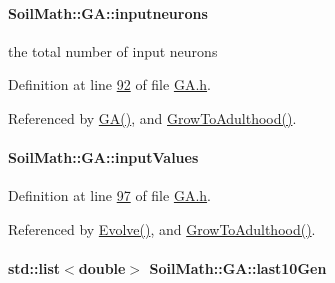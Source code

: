 \paragraph[{inputneurons}]{ Soil\+Math\+::\+G\+A\+::inputneurons\hspace{0.3cm}{\ttfamily [private]}}\label{class_soil_math_1_1_g_a_ac32591e30dde5ac854ae57a7b9e33298}
the total number of input neurons 

Definition at line \hyperlink{_g_a_8h_source_l00092}{92} of file \hyperlink{_g_a_8h_source}{G\+A.\+h}.



Referenced by \hyperlink{_g_a_8cpp_source_l00013}{G\+A()}, and \hyperlink{_g_a_8cpp_source_l00152}{Grow\+To\+Adulthood()}.

\hypertarget{class_soil_math_1_1_g_a_a99276ad62b9616d0f18becc4fbb22980}{}
\paragraph[{input\+Values}]{ Soil\+Math\+::\+G\+A\+::input\+Values\hspace{0.3cm}{\ttfamily [private]}}\label{class_soil_math_1_1_g_a_a99276ad62b9616d0f18becc4fbb22980}


Definition at line \hyperlink{_g_a_8h_source_l00097}{97} of file \hyperlink{_g_a_8h_source}{G\+A.\+h}.



Referenced by \hyperlink{_g_a_8cpp_source_l00023}{Evolve()}, and \hyperlink{_g_a_8cpp_source_l00152}{Grow\+To\+Adulthood()}.

\hypertarget{class_soil_math_1_1_g_a_a1e78adf31886d887ae192537e68aa236}{}
\paragraph[{last10\+Gen}]{\setlength{\rightskip}{0pt plus 5cm}std\+::list$<$double$>$ Soil\+Math\+::\+G\+A\+::last10\+Gen\hspace{0.3cm}{\ttfamily [private]}}\label{class_soil_math_1_1_g_a_a1e78adf31886d887ae192537e68aa236}



